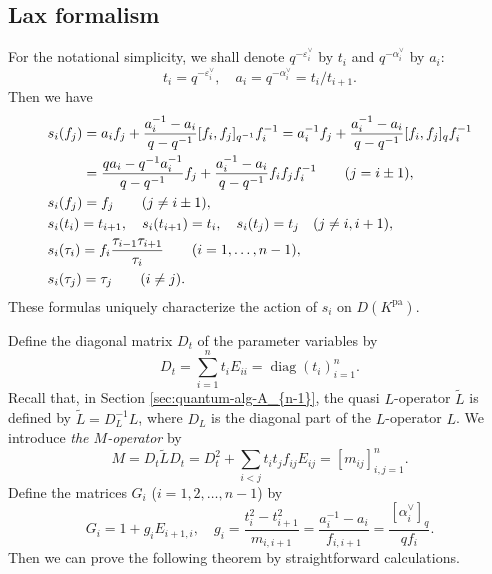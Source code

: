 \documentclass[12pt,twoside]{article}
\newcommand\tL{{\widetilde{L}}}
\newcommand\av{\alpha^\vee}
\newcommand\eps{\varepsilon}
\newcommand\epsv{\eps^\vee}
\newcommand\pa{{\mathrm{pa}}}
\newcommand\diag{\mathop{\mathrm{diag}}\nolimits}
\theoremstyle{plain} %
\theoremstyle{definition} %
\theoremstyle{definition} %
\numberwithin{theorem}{section}
\numberwithin{equation}{section}
\numberwithin{figure}{section}
\numberwithin{table}{section}
\newcommand\secref[1]{Section \ref{#1}}
\begin{document}

\subsection{Lax formalism}
\label{sec:Lax-A_{n-1}}

For the notational simplicity, we shall denote $q^{-\epsv_i}$ by $t_i$
and $q^{-\av_i}$ by $a_i$:
\begin{equation*}
 t_i = q^{-\epsv_i}, \quad 
 a_i = q^{-\av_i} = t_i/t_{i+1}.
\end{equation*}
Then we have
\begin{align}
  &
  s_i(f_j)
  = a_i      f_j + \frac{a_i^{-1}-a_i}{q-q^{-1}} [f_i,f_j]_{q^{-1}} f_i^{-1}
  = a_i^{-1} f_j + \frac{a_i^{-1}-a_i}{q-q^{-1}} [f_i,f_j]_q        f_i^{-1}
 \notag
 \\ &
  \hphantom{s_i(f_j)}
  = \frac{q a_i-q^{-1}a_i^{-1}}{q-q^{-1}} f_j 
  + \frac{a_i^{-1}-a_i}{q-q^{-1}} f_i f_j f_i^{-1}
  \qquad (j=i\pm1), 
 \label{eq:s_i(f_j)-1}
 \\ &
  s_i(f_j) = f_j 
  \qquad (j\ne i\pm 1),
 \label{eq:s_i(f_j)-2}
 \\ &
  s_i(t_i) = t_{i+1}, \quad
  s_i(t_{i+1}) = t_i, \quad
  s_i(t_j) = t_j \quad (j\ne i,i+1),
 \label{eq:s_i(t_j)}
 \\ &
  s_i(\tau_i) 
  = f_i\frac{\tau_{i-1}\tau_{i+1}}{\tau_i} 
  \qquad (i=1,\ldots,n-1),
 \notag
 \\ & 
  s_i(\tau_j) = \tau_j
  \qquad (i\ne j).
 \notag 
\end{align}
These formulas uniquely characterize the action of $s_i$ on $D(K^\pa)$.

Define the diagonal matrix $D_t$ of the parameter variables by 
\begin{equation*}
 D_t = \sum_{i=1}^n t_i E_{ii} = \diag(t_i)_{i=1}^n.
\end{equation*}
Recall that, in \secref{sec:quantum-alg-A_{n-1}}, 
the quasi $L$-operator $\tL$ is defined by $\tL=D_L^{-1}L$, 
where $D_L$ is the diagonal part of the $L$-operator $L$.
We introduce {\em the $M$-operator} by
\begin{equation*}
 M = D_t \tL D_t 
   = D_t^2 + \sum_{i<j}t_i t_j f_{ij}E_{ij}
   = [m_{ij}]_{i,j=1}^n.
\end{equation*}
Define the matrices $G_i$ ($i=1,2,\ldots,n-1$) by
\begin{equation*}
 G_i = 1 + g_i E_{i+1,i}, \quad
 g_i = \frac{t_i^2-t_{i+1}^2}{m_{i,i+1}}
     = \frac{a_i^{-1}-a_i}{f_{i,i+1}}
     = \frac{[\av_i]_q}{q f_i}.
\end{equation*}
Then we can prove the following theorem by straightforward calculations.
\end{document}
